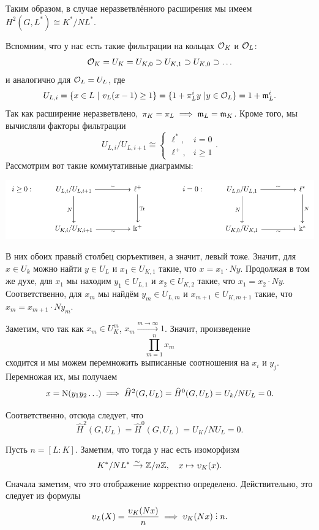 	Таким образом, в случае неразветвлённого расширения мы имеем $H^2(G, L^*) \cong K^*/N L^*$. 

	Вспомним, что у нас есть такие фильтрации на кольцах $\mathcal{O}_K$ и $\mathcal{O}_L$:
	\[
		\mathcal{O}_K = U_K = U_{K, 0} \supset U_{K, 1} \supset U_{K, 0} \supset \ldots 
	\]
	и аналогично для $\mathcal{O}_L = U_L$, где 
	\[
		U_{L, i} = \{ x \in L \ \vert \ v_{L}(x - 1) \ge 1 \} = \{ 1 + \pi_L^i y \ \vert y \in \mathcal{O}_L \} = 1 + \mathfrak{m}_L^i. 
	\]
	Так как расширение неразветвлено, $\pi_K = \pi_L \implies \mathfrak{m}_L = \mathfrak{m}_K$. Кроме того, мы вычисляли факторы фильтрации 
	\[
	 	U_{L, i} / U_{L, i + 1} \cong \begin{cases} \ell^*, &  i = 0 \\ \ell^+, & i \ge 1  \end{cases}.
	 \] 
	 Рассмотрим вот такие коммутативные диаграммы: 

	 \begin{center}
	 	\includegraphics{lectures/6/pictures/cd_24.pdf}
	 \end{center}

	 В них обоих правый столбец сюръективен, а значит, левый тоже. Значит, для $x \in U_k$ можно найти $y \in U_L $ и $x_1 \in U_{K, 1}$ такие, что $x = x_1 \cdot Ny$. Продолжая в том же духе, для $x_1$ мы находим $y_1 \in U_{L, 1}$ и $x_2 \in U_{K, 2}$ такие, что $x_1 = x_2 \cdot Ny$. Соответственно, для $x_m$ мы найдём $y_m \in U_{L, m}$ и $x_{m + 1} \in U_{K, m + 1}$ такие, что $x_m = x_{m + 1} \cdot N y_m$.

	 Заметим, что так как $x_m \in U_{K}^m$, $x_m \xrightarrow{m \to \infty} 1$. Значит, произведение 
	 \[
	 	\prod_{m = 1}^n x_m
	 \]
	 сходится и мы можем перемножить выписанные соотношения на $x_i$ и $y_j$. Перемножая их, мы получаем 
	 \[
	 	x = \operatorname{\mathrm{N}}(y_1 y_2 \ldots ) \implies \widehat{H}^2(G, U_L) = \widehat{H}^0(G, U_L) = U_k/N U_L = 0.
	 \]

	 Соответственно, отсюда следует, что 
	 \[
	 	\widehat{H}^2(G, U_L) = \widehat{H}^0(G, U_L) = U_K/N U_L = 0.
	 \]

	 Пусть $n = [L : K]$. Заметим, что тогда у нас есть изоморфизм 
	 \[
	 	K^*/NL^* \xrightarrow{\sim} \mathbb{Z}/n\mathbb{Z}, \quad x \mapsto \upsilon_K(x).
	 \]
	 Сначала заметим, что это отображение корректно определено. Действительно,  это следует из формулы
	 \[
	 	\v_L(X) = \frac{\v_K(Nx)}{n} \implies \v_K(Nx) \divby n.
	 \]


